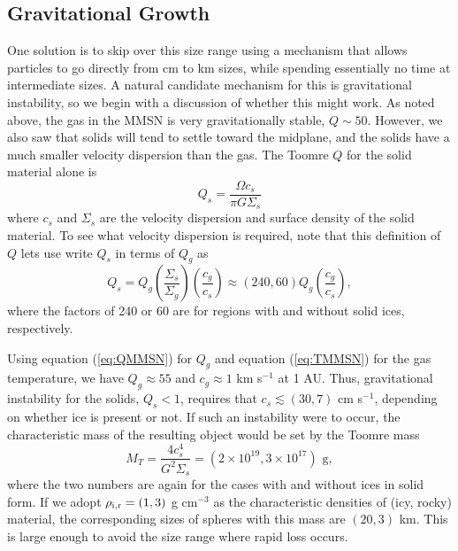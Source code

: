 \subsection{Gravitational Growth}

One solution is to skip over this size range using a mechanism that allows particles to go directly from cm to km sizes, while spending essentially no time at intermediate sizes. A natural candidate mechanism for this is gravitational instability, so we begin with a discussion of whether this might work. As noted above, the gas in the MMSN is very gravitationally stable, $Q \sim 50$. However, we also saw that solids will tend to settle toward the midplane, and the solids have a much smaller velocity dispersion than the gas. The Toomre $Q$ for the solid material alone is
\begin{equation}
Q_s = \frac{\Omega c_s}{\pi G \Sigma_s}
\end{equation}
where $c_s$ and $\Sigma_s$ are the velocity dispersion and surface density of the solid material. To see what velocity dispersion is required, note that this definition of $Q$ lets use write $Q_s$ in terms of $Q_g$ as
\begin{equation}
Q_s = Q_g \left(\frac{\Sigma_s}{\Sigma_g}\right) \left(\frac{c_g}{c_s}\right) \approx(240, 60) Q_g \left(\frac{c_g}{c_s}\right),
\end{equation}
where the factors of 240 or 60 are for regions with and without solid ices, respectively.

Using equation (\ref{eq:QMMSN}) for $Q_g$ and equation (\ref{eq:TMMSN}) for the gas temperature, we have $Q_g\approx 55$ and $c_g\approx 1$ km s$^{-1}$ at 1 AU. Thus, gravitational instability for the solids, $Q_s<1$, requires that $c_s \lesssim (30, 7)$ cm s$^{-1}$, depending on whether ice is present or not. If such an instability were to occur, the characteristic mass of the resulting object would be set by the Toomre mass
\begin{equation}
M_T = \frac{4 c_s^4}{G^2 \Sigma_s} = (2\times 10^{19}, 3\times 10^{17})\mbox{ g},
\end{equation}
where the two numbers are again for the cases with and without ices in solid form. If we adopt $\rho_{\rm i,r} = (1,3)$ g cm$^{-3}$ as the characteristic densities of (icy, rocky) material, the corresponding sizes of spheres with this mass are $(20, 3)$ km. This is large enough to avoid the size range where rapid loss occurs.

